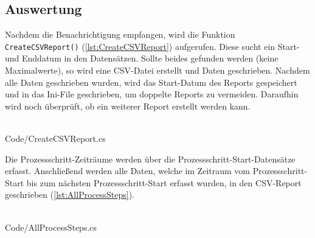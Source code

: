 \subsection{Auswertung}
Nachdem die Benachrichtigung empfangen, wird die Funktion \texttt{CreateCSVReport()} (\autoref{lst:CreateCSVReport}) aufgerufen. Diese sucht ein Start- und Enddatum in den Datensätzen. Sollte beides gefunden werden (keine Maximalwerte), so wird eine CSV-Datei erstellt und Daten geschrieben. Nachdem alle Daten geschrieben wurden, wird das Start-Datum des Reports gespeichert und in das Ini-File geschrieben, um doppelte Reports zu vermeiden. Daraufhin wird noch überprüft, ob ein weiterer Report erstellt werden kann.
\ \\
\begin{minipage}{\textwidth}
\ \\
 {Code/CreateCSVReport.cs}
\ \\
\end{minipage}
Die Prozessschritt-Zeiträume werden über die Prozessschritt-Start-Datensätze erfasst. Anschließend werden alle Daten, welche im Zeitraum vom Prozessschritt-Start bis zum nächsten Prozessschritt-Start erfasst wurden, in den CSV-Report geschrieben (\autoref{lst:AllProcessSteps}).
\ \\
\begin{minipage}{\textwidth}
\ \\
 {Code/AllProcessSteps.cs}
\ \\
\end{minipage}
\ \\
